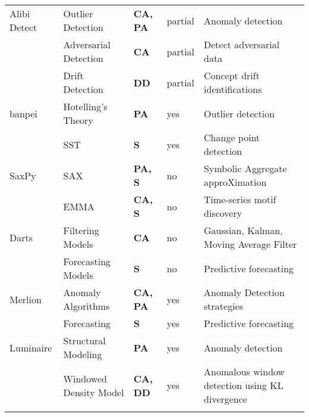 \begin{tabularx}{\linewidth}{ llllX }
    Alibi Detect \cite{alibi-detect} & Outlier Detection & \textbf{CA, PA} & partial & Anomaly detection\\
    & Adversarial Detection & \textbf{CA} & partial & Detect adversarial data \\
    & Drift Detection & \textbf{DD} & partial & Concept drift identifications \\
    \midrule 
    banpei \cite{banpei} & Hotelling's Theory &  \textbf{PA} & yes & Outlier detection\\
    & SST & \textbf{S} & yes & Change point detection \\
    \midrule 
    SaxPy \cite{senin2018grammarviz-saxpy} & SAX &  \textbf{PA, S} & no & Symbolic Aggregate approXimation \\
    & EMMA & \textbf{CA, S} & no & Time-series motif discovery\\
    \midrule 
    Darts \cite{herzen2021darts} & Filtering Models & \textbf{CA} & no & Gaussian, Kalman, Moving Average Filter \\
    & Forecasting Models & \textbf{S} & no & Predictive forecasting \\
    \midrule 
    Merlion \cite{bhatnagar2021merlion} & Anomaly Algorithms &  \textbf{CA, PA} & yes & Anomaly Detection strategies \\
    & Forecasting & \textbf{S} & yes & Predictive forecasting \\
    \midrule 
    Luminaire \cite{chakraborty2020building-luminaire} & Structural Modeling &  \textbf{ PA } & yes & Anomaly detection \\
    & Windowed Density Model & \textbf{CA, DD} & yes & Anomalous window detection using KL divergence \\
    \bottomrule 
    \label{tab:anom_detect_lib}
\end{tabularx}